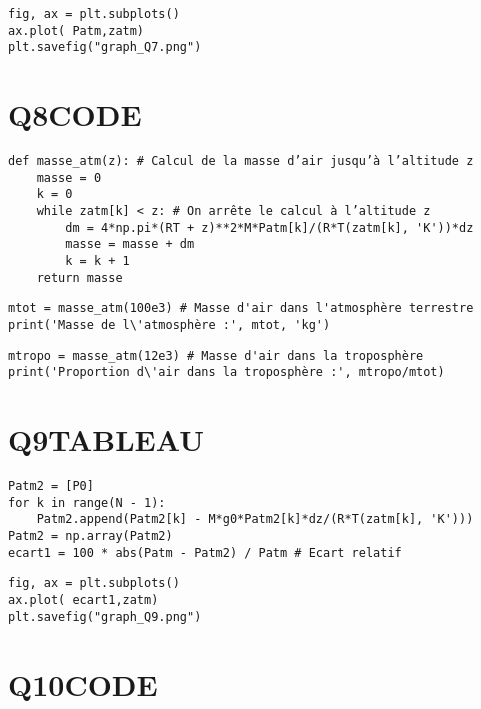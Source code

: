 \documentclass[11pt]{article}
\begin{document}
\begin{verbatim}
fig, ax = plt.subplots()
ax.plot( Patm,zatm)
plt.savefig("graph_Q7.png")
\end{verbatim}


\section{Q8\hfill{}\textsc{CODE}}
\label{sec:org4a88482}


\begin{verbatim}
def masse_atm(z): # Calcul de la masse d’air jusqu’à l’altitude z
    masse = 0
    k = 0
    while zatm[k] < z: # On arrête le calcul à l’altitude z
        dm = 4*np.pi*(RT + z)**2*M*Patm[k]/(R*T(zatm[k], 'K'))*dz
        masse = masse + dm
        k = k + 1
    return masse
\end{verbatim}

\begin{verbatim}
mtot = masse_atm(100e3) # Masse d'air dans l'atmosphère terrestre
print('Masse de l\'atmosphère :', mtot, 'kg')
\end{verbatim}

\begin{verbatim}
mtropo = masse_atm(12e3) # Masse d'air dans la troposphère
print('Proportion d\'air dans la troposphère :', mtropo/mtot)
\end{verbatim}


\section{Q9\hfill{}\textsc{TABLEAU}}
\label{sec:orgaf9de01}

\begin{verbatim}
Patm2 = [P0]
for k in range(N - 1):
    Patm2.append(Patm2[k] - M*g0*Patm2[k]*dz/(R*T(zatm[k], 'K')))
Patm2 = np.array(Patm2)
ecart1 = 100 * abs(Patm - Patm2) / Patm # Ecart relatif
\end{verbatim}

\begin{verbatim}
fig, ax = plt.subplots()
ax.plot( ecart1,zatm)
plt.savefig("graph_Q9.png")
\end{verbatim}



\section{Q10\hfill{}\textsc{CODE}}
\label{sec:orgd088227}
\end{document}
